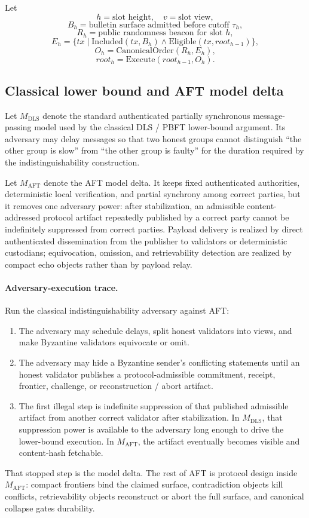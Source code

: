 \documentclass[11pt]{article}
\newcommand{\AFT}{\textsc{AFT}}
\newcommand{\suchthat}{\;|\;}
\begin{document}
Let
\[
h = \text{slot height}, \quad
v = \text{slot view},
\]
\[
B_h = \text{bulletin surface admitted before cutoff }\tau_h,
\]
\[
R_h = \text{public randomness beacon for slot }h,
\]
\[
E_h = \{tx \suchthat \mathrm{Included}(tx, B_h) \wedge \mathrm{Eligible}(tx, root_{h-1})\},
\]
\[
O_h = \mathrm{CanonicalOrder}(R_h, E_h),
\]
\[
root_h = \mathrm{Execute}(root_{h-1}, O_h).
\]

\subsection{Classical lower bound and AFT model delta}

Let \(M_{\mathrm{DLS}}\) denote the standard authenticated partially
synchronous message-passing model used by the classical DLS / PBFT lower-bound
argument. Its adversary may delay messages so that two honest groups cannot
distinguish ``the other group is slow'' from ``the other group is faulty'' for
the duration required by the indistinguishability construction.

Let \(M_{\mathrm{AFT}}\) denote the AFT model delta. It keeps fixed authenticated
authorities, deterministic local verification, and partial synchrony among
correct parties, but it removes one adversary power: after stabilization, an
admissible content-addressed protocol artifact repeatedly published by a
correct party cannot be indefinitely suppressed from correct parties. Payload
delivery is realized by direct authenticated dissemination from the publisher
to validators or deterministic custodians; equivocation, omission, and
retrievability detection are realized by compact echo objects rather than by
payload relay.

\paragraph{Adversary-execution trace.}
Run the classical indistinguishability adversary against \AFT{}:
\begin{enumerate}[leftmargin=1.5em]
\item The adversary may schedule delays, split honest validators into views,
and make Byzantine validators equivocate or omit.
\item The adversary may hide a Byzantine sender's conflicting statements until
an honest validator publishes a protocol-admissible commitment, receipt,
frontier, challenge, or reconstruction / abort artifact.
\item The first illegal step is indefinite suppression of that published
admissible artifact from another correct validator after stabilization. In
\(M_{\mathrm{DLS}}\), that suppression power is available to the adversary
long enough to drive the lower-bound execution. In \(M_{\mathrm{AFT}}\), the artifact
eventually becomes visible and content-hash fetchable.
\end{enumerate}
That stopped step is the model delta. The rest of \AFT{} is protocol design
inside \(M_{\mathrm{AFT}}\): compact frontiers bind the claimed surface, contradiction
objects kill conflicts, retrievability objects reconstruct or abort the full
surface, and canonical collapse gates durability.
\end{document}
